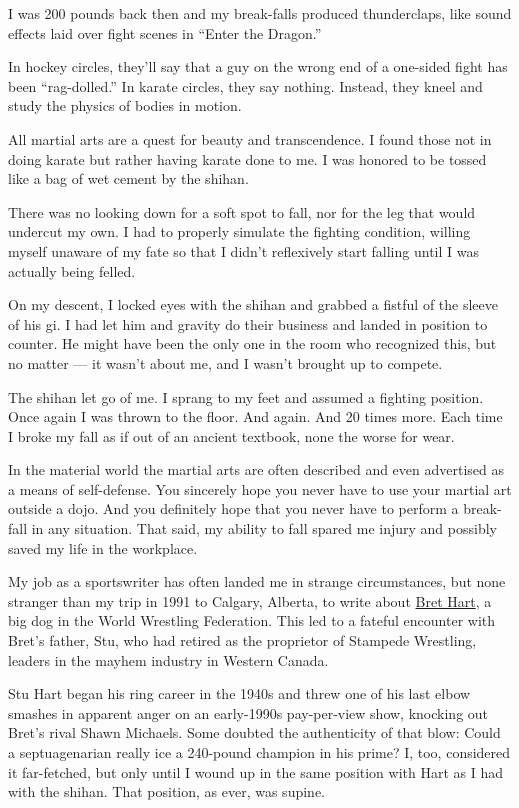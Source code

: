 I was 200 pounds back then and my break-falls produced thunderclaps,
like sound effects laid over fight scenes in ``Enter the Dragon.''

In hockey circles, they'll say that a guy on the wrong end of a
one-sided fight has been ``rag-dolled.'' In karate circles, they say
nothing. Instead, they kneel and study the physics of bodies in motion.

All martial arts are a quest for beauty and transcendence. I found those
not in doing karate but rather having karate done to me. I was honored
to be tossed like a bag of wet cement by the shihan.

There was no looking down for a soft spot to fall, nor for the leg that
would undercut my own. I had to properly simulate the fighting
condition, willing myself unaware of my fate so that I didn't
reflexively start falling until I was actually being felled.

On my descent, I locked eyes with the shihan and grabbed a fistful of
the sleeve of his gi. I had let him and gravity do their business and
landed in position to counter. He might have been the only one in the
room who recognized this, but no matter --- it wasn't about me, and I
wasn't brought up to compete.

The shihan let go of me. I sprang to my feet and assumed a fighting
position. Once again I was thrown to the floor. And again. And 20 times
more. Each time I broke my fall as if out of an ancient textbook, none
the worse for wear.

In the material world the martial arts are often described and even
advertised as a means of self-defense. You sincerely hope you never have
to use your martial art outside a dojo. And you definitely hope that you
never have to perform a break-fall in any situation. That said, my
ability to fall spared me injury and possibly saved my life in the
workplace.

My job as a sportswriter has often landed me in strange circumstances,
but none stranger than my trip in 1991 to Calgary, Alberta, to write
about \href{https://www.brethart.com/}{Bret Hart}, a big dog in the
World Wrestling Federation. This led to a fateful encounter with Bret's
father, Stu, who had retired as the proprietor of Stampede Wrestling,
leaders in the mayhem industry in Western Canada.

Stu Hart began his ring career in the 1940s and threw one of his last
elbow smashes in apparent anger on an early-1990s pay-per-view show,
knocking out Bret's rival Shawn Michaels. Some doubted the authenticity
of that blow: Could a septuagenarian really ice a 240-pound champion in
his prime? I, too, considered it far-fetched, but only until I wound up
in the same position with Hart as I had with the shihan. That position,
as ever, was supine.

